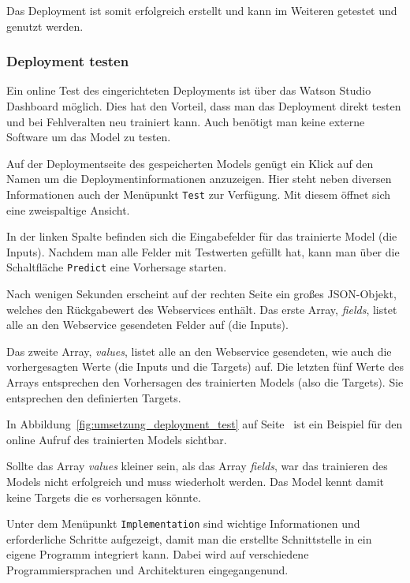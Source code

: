 Das Deployment ist somit erfolgreich erstellt und kann im Weiteren getestet und genutzt werden.

\subsubsection{Deployment testen}
Ein online Test des eingerichteten Deployments ist über das Watson Studio Dashboard möglich. Dies hat den Vorteil, dass
man das Deployment direkt testen und bei Fehlveralten neu trainiert kann. Auch benötigt man keine externe Software um
das Model zu testen.

Auf der Deploymentseite des gespeicherten Models genügt ein Klick auf den Namen um die Deploymentinformationen anzuzeigen.
Hier steht neben diversen Informationen auch der Menüpunkt \texttt{Test} zur Verfügung. Mit diesem öffnet sich eine
zweispaltige Ansicht.

In der linken Spalte befinden sich die Eingabefelder für das trainierte Model (die Inputs). Nachdem man alle Felder mit
Testwerten gefüllt hat, kann man über die Schaltfläche \texttt{Predict} eine Vorhersage starten.

Nach wenigen Sekunden erscheint auf der rechten Seite ein großes JSON-Objekt, welches den Rückgabewert des Webservices
enthält. Das erste Array, \textit{fields}, listet alle an den Webservice gesendeten Felder auf (die Inputs).

Das zweite Array, \textit{values}, listet alle an den Webservice gesendeten, wie auch die vorhergesagten Werte (die
Inputs und die Targets) auf. Die letzten fünf Werte des Arrays entsprechen den Vorhersagen des trainierten Models (also
die Targets). Sie entsprechen den definierten Targets.

In Abbildung~\ref{fig:umsetzung_deployment_test} auf Seite~\pageref{fig:umsetzung_deployment_test} ist ein Beispiel für
den online Aufruf des trainierten Models sichtbar.

Sollte das Array \textit{values} kleiner sein, als das Array \textit{fields}, war das trainieren des Models nicht
erfolgreich und muss wiederholt werden. Das Model kennt damit keine Targets die es vorhersagen könnte.

Unter dem Menüpunkt \texttt{Implementation} sind wichtige Informationen und erforderliche Schritte aufgezeigt, damit
man die erstellte Schnittstelle in ein eigene Programm integriert kann. Dabei wird auf verschiedene Programmiersprachen
und Architekturen eingegangenund.

